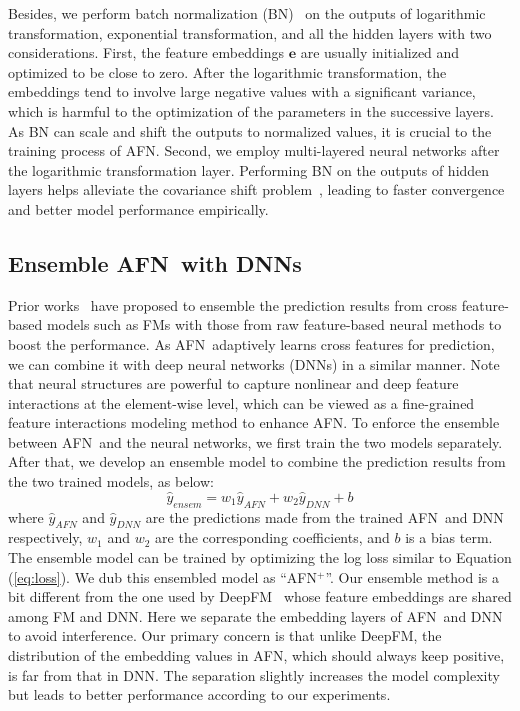 \documentclass[letterpaper]{article} \usepackage{aaai20}  \usepackage{times}  \usepackage{helvet} \usepackage{courier}  \usepackage[hyphens]{url}  \usepackage{graphicx} \urlstyle{rm} \def\UrlFont{\rm}  \usepackage{graphicx}  \frenchspacing  \setlength{\pdfpagewidth}{8.5in}  \setlength{\pdfpageheight}{11in}
\newcommand{\model}{{AFN}~}
\newcommand{\modelns}{{AFN}}
\begin{document}
Besides, we perform batch normalization (BN)~\cite{bn} on the outputs of logarithmic transformation, exponential transformation, and all the hidden layers with two considerations. First, the feature embeddings $\mathbf{e}$ are usually initialized and optimized to be close to zero. After the logarithmic transformation, the embeddings tend to involve large negative values with a significant variance, which is harmful to the optimization of the parameters in the successive layers. As BN can scale and shift the outputs to normalized values, it is crucial to the training process of \modelns. Second, we employ multi-layered neural networks after the logarithmic transformation layer. Performing BN on the outputs of hidden layers helps alleviate the covariance shift problem~\cite{bn}, leading to faster convergence and better model performance empirically.

\subsection{Ensemble \model with DNNs}
Prior works~\cite{wide_and_deep,DeepFM,xDeepFM} have proposed to ensemble the prediction results from cross feature-based models such as FMs with those from raw feature-based neural methods to boost the performance. 
As \model adaptively learns cross features for prediction, we can combine it with deep neural networks (DNNs) in a similar manner. Note that neural structures are powerful to capture nonlinear and deep feature interactions at the element-wise level, which can be viewed as a fine-grained feature interactions modeling method to enhance \modelns.
To enforce the ensemble between \model and the neural networks, we first train the two models separately. After that, we develop an ensemble model to combine the prediction results from the two trained models, as below:
\begin{equation} 
	\hat{y}_{ensem}=w_1\hat{y}_{AFN}+w_2\hat{y}_{DNN}+b
\end{equation}
where $\hat{y}_{AFN}$ and $\hat{y}_{DNN}$ are the predictions made from the trained \model and DNN respectively, $w_1$ and $w_2$ are the corresponding coefficients, and $b$ is a bias term. The ensemble model can be trained by optimizing the log loss similar to Equation (\ref{eq:loss}).
We dub this ensembled model as ``\modelns$^+$''. Our ensemble method is a bit different from the one used by DeepFM~\cite{DeepFM} whose feature embeddings are shared among FM and DNN. Here we separate the embedding layers of \model and DNN to avoid interference. Our primary concern is that unlike DeepFM, the distribution of the embedding values in \modelns, which should always keep positive, is far from that in DNN. The separation slightly increases the model complexity but leads to better performance according to our experiments.
\end{document}
